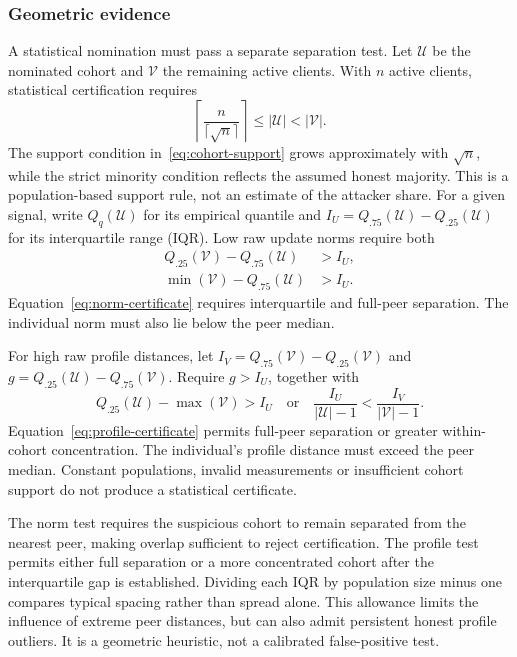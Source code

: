 \documentclass[journal]{IEEEtran}
\begin{document}
\subsubsection{Geometric evidence}
A statistical nomination must pass a separate separation test. Let
$\mathcal U$ be the nominated cohort and $\mathcal V$ the remaining active
clients. With $n$ active clients, statistical certification requires
\begin{equation}\label{eq:cohort-support}
 \left\lceil\frac{n}{\lceil\sqrt n\rceil}\right\rceil
       \leq|\mathcal U|<|\mathcal V|.
\end{equation}
The support condition in~\eqref{eq:cohort-support} grows approximately with $\sqrt n$, while the strict
minority condition reflects the assumed honest majority. This is a
population-based support rule, not an estimate of the attacker share.
For a given signal, write $Q_q(\mathcal U)$ for its empirical quantile
and $I_U=Q_{.75}(\mathcal U)-Q_{.25}(\mathcal U)$ for its interquartile
range (IQR). Low raw update norms require both
\begin{align}\label{eq:norm-certificate}
 Q_{.25}(\mathcal V)-Q_{.75}(\mathcal U)&>I_U,\\
 \min(\mathcal V)-Q_{.75}(\mathcal U)&>I_U.\nonumber
\end{align}
Equation~\eqref{eq:norm-certificate} requires interquartile and full-peer separation. The individual norm must also lie below the peer median.

For high raw profile distances, let
$I_V=Q_{.75}(\mathcal V)-Q_{.25}(\mathcal V)$ and
$g=Q_{.25}(\mathcal U)-Q_{.75}(\mathcal V)$. Require $g>I_U$,
together with
\begin{equation}\label{eq:profile-certificate}
 Q_{.25}(\mathcal U)-\max(\mathcal V)>I_U
 \quad\text{or}\quad
 \frac{I_U}{|\mathcal U|-1}<\frac{I_V}{|\mathcal V|-1}.
\end{equation}
Equation~\eqref{eq:profile-certificate} permits full-peer separation or greater within-cohort concentration. The individual's profile distance must exceed the peer median. Constant
populations, invalid measurements or insufficient cohort support do not
produce a statistical certificate.

The norm test requires the suspicious cohort to remain separated from
the nearest peer, making overlap sufficient to reject certification.
The profile test permits either full separation or a more concentrated
cohort after the interquartile gap is established. Dividing each IQR by
population size minus one compares typical spacing rather than spread
alone. This allowance limits the influence of extreme peer distances,
but can also admit persistent honest profile outliers. It is a geometric
heuristic, not a calibrated false-positive test.
\end{document}
